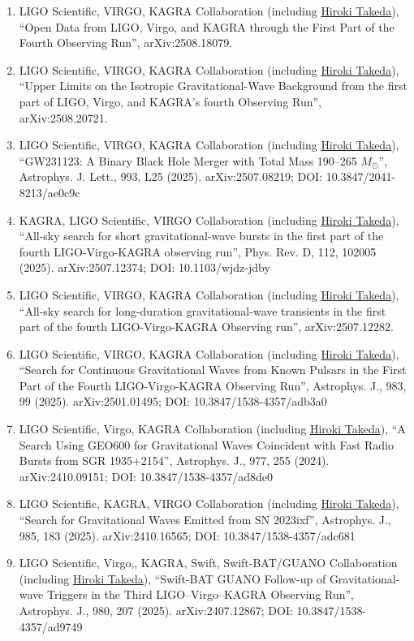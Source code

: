 \documentclass[uplatex, 12pt]{article}
\begin{document}
\begin{enumerate}
\item LIGO Scientific, VIRGO, KAGRA Collaboration (including \uline{Hiroki Takeda}), “Open Data from LIGO, Virgo, and KAGRA through the First Part of the Fourth Observing Run”, arXiv:2508.18079.
\item LIGO Scientific, VIRGO, KAGRA Collaboration (including \uline{Hiroki Takeda}), “Upper Limits on the Isotropic Gravitational-Wave Background from the first part of LIGO, Virgo, and KAGRA's fourth Observing Run”, arXiv:2508.20721.
\item LIGO Scientific, VIRGO, KAGRA Collaboration (including \uline{Hiroki Takeda}), “GW231123: A Binary Black Hole Merger with Total Mass 190--265 $M_{\odot}$”, Astrophys. J. Lett., 993, L25 (2025). arXiv:2507.08219; DOI: 10.3847/2041-8213/ae0c9c
\item KAGRA, LIGO Scientific, VIRGO Collaboration (including \uline{Hiroki Takeda}), “All-sky search for short gravitational-wave bursts in the first part of the fourth LIGO-Virgo-KAGRA observing run”, Phys. Rev. D, 112, 102005 (2025). arXiv:2507.12374; DOI: 10.1103/wjdz-jdby
\item LIGO Scientific, VIRGO, KAGRA Collaboration (including \uline{Hiroki Takeda}), “All-sky search for long-duration gravitational-wave transients in the first part of the fourth LIGO-Virgo-KAGRA Observing run”, arXiv:2507.12282.
\item LIGO Scientific, VIRGO, KAGRA Collaboration (including \uline{Hiroki Takeda}), “Search for Continuous Gravitational Waves from Known Pulsars in the First Part of the Fourth LIGO-Virgo-KAGRA Observing Run”, Astrophys. J., 983, 99 (2025). arXiv:2501.01495; DOI: 10.3847/1538-4357/adb3a0
\item LIGO Scientific, Virgo, KAGRA Collaboration (including \uline{Hiroki Takeda}), “A Search Using GEO600 for Gravitational Waves Coincident with Fast Radio Bursts from SGR 1935+2154”, Astrophys. J., 977, 255 (2024). arXiv:2410.09151; DOI: 10.3847/1538-4357/ad8de0
\item LIGO Scientific, KAGRA, VIRGO Collaboration (including \uline{Hiroki Takeda}), “Search for Gravitational Waves Emitted from SN 2023ixf”, Astrophys. J., 985, 183 (2025). arXiv:2410.16565; DOI: 10.3847/1538-4357/adc681
\item LIGO Scientific, Virgo,, KAGRA, Swift, Swift-BAT/GUANO Collaboration (including \uline{Hiroki Takeda}), “Swift-BAT GUANO Follow-up of Gravitational-wave Triggers in the Third LIGO--Virgo--KAGRA Observing Run”, Astrophys. J., 980, 207 (2025). arXiv:2407.12867; DOI: 10.3847/1538-4357/ad9749

\end{enumerate}
\end{document}

